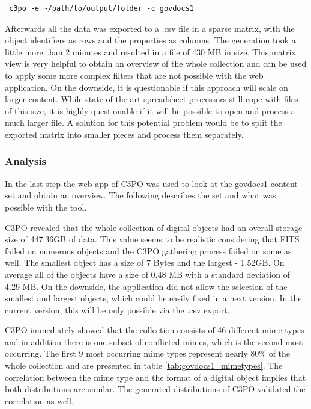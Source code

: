 
\begin{verbatim}
 c3po -e ~/path/to/output/folder -c govdocs1
\end{verbatim}
Afterwards all the data was exported to a .csv file in a sparse matrix, with the object identifiers as rows and the properties as columns.
The generation took a little more than 2 minutes and resulted in a file of 430 MB in size.
This matrix view is very helpful to obtain an overview of the whole collection and can be used to apply some more complex filters that are not possible with the web application.
On the downside, it is questionable if this approach will scale on larger content.
While state of the art spreadsheet processors still cope with files of this size, it is highly questionable if it will be possible to open and process a much larger file.
A solution for this potential problem would be to split the exported matrix into smaller pieces and process them separately.

\subsubsection{Analysis}
In the last step the web app of C3PO was used to look at the govdocs1 content set and obtain an overview.
The following describes the set and what was possible with the tool.

C3PO revealed that the whole collection of digital objects had an overall storage size of 447.36GB of data.
This value seems to be realistic considering that FITS failed on numerous objects and the C3PO gathering process failed on some as well.
The smallest object has a size of 7 Bytes and the largest - 1.52GB.
On average all of the objects have a size of 0.48 MB with a standard deviation of 4.29 MB.
On the downside, the application did not allow the selection of the smallest and largest objects, which could be easily fixed in a next version.
In the current version, this will be only possible via the .csv export.

C3PO immediately showed that the collection consists of 46 different mime types and in addition there is one subset of conflicted mimes, which is the second most occurring.
The first 9 most occurring mime types represent nearly 80\% of the whole collection and are presented in table \ref{tab:govdocs1_mimetypes}.
The correlation between the mime type and the format of a digital object implies that both distributions are similar.
The generated distributions of C3PO validated the correlation as well.

